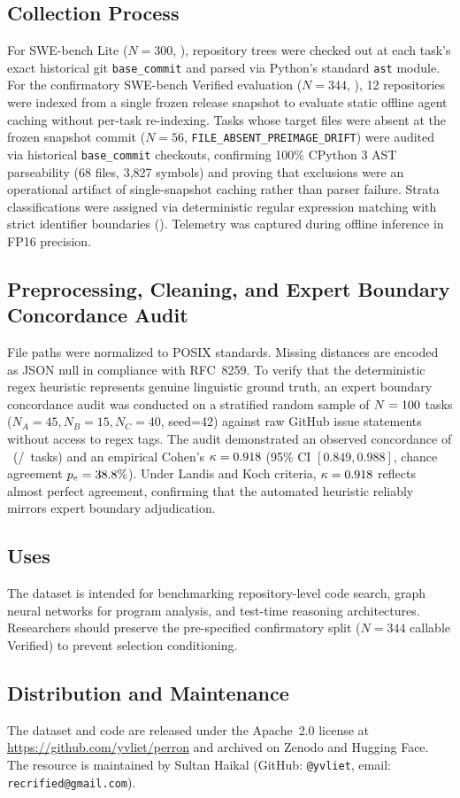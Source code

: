 \subsection{Collection Process}
For SWE-bench Lite ($N=300$, ), repository trees were checked out at each task's exact historical git \texttt{base\_commit} and parsed via Python's standard \texttt{ast} module. For the confirmatory SWE-bench Verified evaluation ($N=344$, ), 12 repositories were indexed from a single frozen release snapshot to evaluate static offline agent caching without per-task re-indexing. Tasks whose target files were absent at the frozen snapshot commit ($N=56$, \texttt{FILE\_ABSENT\_PREIMAGE\_DRIFT}) were audited via historical \texttt{base\_commit} checkouts, confirming 100\% CPython 3 AST parseability (68 files, 3{,}827 symbols) and proving that exclusions were an operational artifact of single-snapshot caching rather than parser failure. Strata classifications were assigned via deterministic regular expression matching with strict identifier boundaries (). Telemetry was captured during offline inference in FP16 precision.

\subsection{Preprocessing, Cleaning, and Expert Boundary Concordance Audit}
File paths were normalized to POSIX standards. Missing distances are encoded as JSON null in compliance with RFC~8259. To verify that the deterministic regex heuristic represents genuine linguistic ground truth, an expert boundary concordance audit was conducted on a stratified random sample of $N=100$ tasks ($N_A=45, N_B=15, N_C=40$, seed=42) against raw GitHub issue statements without access to regex tags.
The audit demonstrated an observed concordance of \StrataHumanConcordance\ (\StrataConcordantCount/\StrataSampleSize\ tasks) and an empirical Cohen's $\kappa = 0.918$ (95\% CI $[0.849, 0.988]$, chance agreement $p_e = 38.8\%$). Under Landis and Koch criteria, $\kappa = 0.918$ reflects almost perfect agreement, confirming that the automated heuristic reliably mirrors expert boundary adjudication.

\subsection{Uses}
The dataset is intended for benchmarking repository-level code search, graph neural networks for program analysis, and test-time reasoning architectures. Researchers should preserve the pre-specified confirmatory split ($N=344$ callable Verified) to prevent selection conditioning.

\subsection{Distribution and Maintenance}
The dataset and code are released under the Apache~2.0 license at \url{https://github.com/yvliet/perron} and archived on Zenodo and Hugging Face. The resource is maintained by Sultan Haikal (GitHub: \texttt{@yvliet}, email: \texttt{recrified@}\allowbreak\texttt{gmail.com}).
